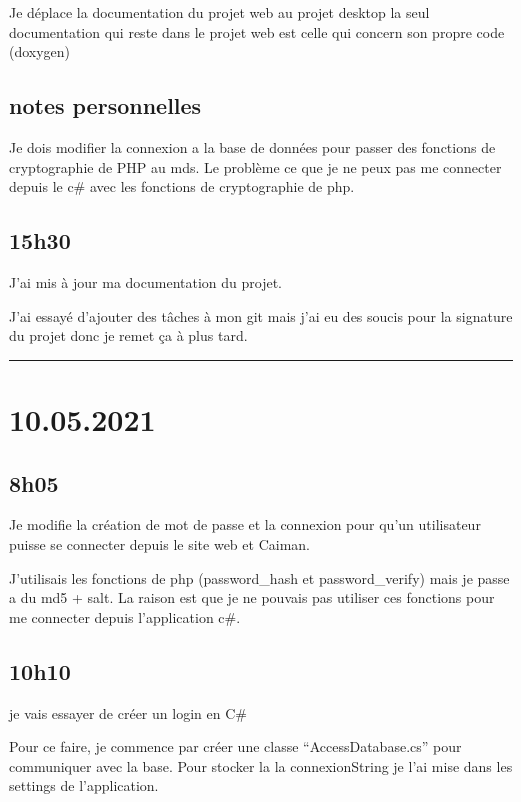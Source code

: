 \documentclass[a4paper,12pt,french]{sphinxmanual}
\begin{document}
\sphinxAtStartPar
Je déplace la documentation du projet web au projet desktop la seul documentation qui reste dans le projet web est celle qui concern son propre code (doxygen)


\subsection{notes personnelles}
\label{\detokenize{logbook:id87}}
\sphinxAtStartPar
Je dois modifier la connexion a la base de données  pour passer des fonctions de cryptographie de PHP au mds. Le problème ce que je ne peux pas me connecter depuis le c\# avec les fonctions de cryptographie de php.


\subsection{15h30}
\label{\detokenize{logbook:id88}}
\sphinxAtStartPar
J’ai mis à jour ma documentation du projet.

\sphinxAtStartPar
J’ai essayé d’ajouter des tâches à mon git mais j’ai eu des soucis pour la signature du projet donc je remet ça à plus tard.


\bigskip\hrule\bigskip



\section{10.05.2021}
\label{\detokenize{logbook:id89}}

\subsection{8h05}
\label{\detokenize{logbook:id90}}
\sphinxAtStartPar
Je modifie la création de mot de passe et la connexion pour qu’un utilisateur puisse se connecter depuis le site web et Caiman.

\sphinxAtStartPar
J’utilisais les fonctions de php (password\_hash et password\_verify) mais je passe a du md5 + salt. La raison est que je ne pouvais pas utiliser ces fonctions pour me connecter depuis l’application c\#.


\subsection{10h10}
\label{\detokenize{logbook:id91}}
\sphinxAtStartPar
je vais essayer de créer un login en C\#

\sphinxAtStartPar
Pour ce faire, je commence par créer une classe “AccessDatabase.cs” pour communiquer avec la base. Pour stocker la la connexionString je l’ai mise dans les settings de l’application.
\end{document}

